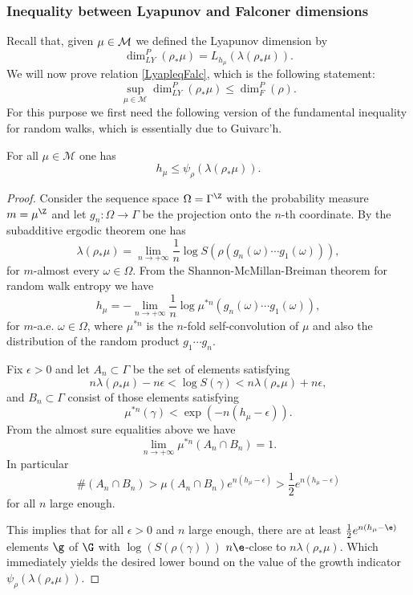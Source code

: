 \subsubsection{Inequality between Lyapunov and Falconer dimensions\label{proofLyap}}

Recall that, given \(\mu \in\nobreak \mathcal{M}\) we defined the Lyapunov dimension by
\[
\dim_{LY}^P(\rho_\ast \mu) = L_{h_\mu}(\lambda(\rho_*\mu)).
\]
We will now prove relation \eqref{LyapleqFalc}, which is the following statement:
\[
\sup_{\mu \in \mathcal{M}}\dim_{LY}^P(\rho_\ast \mu) \le \dim_F^P(\rho).
\]
For this purpose we first need the following version of the fundamental inequality for random walks, which is essentially due to Guivarc'h.

\begin{lemma}
For all \(\mu \in \mathcal{M}\) one has
\[
h_\mu \le \psi_{\rho}(\lambda(\rho_*\mu)).
\]
\end{lemma}
\begin{proof}
Consider the sequence space \(\Omega = \Gamma^{\Z}\) with the probability measure \(m = \mu^\Z\) and let \(g_n:\Omega \to \Gamma\) be the projection onto the \(n\)-th coordinate.
By the subadditive ergodic theorem \cite{Ose68} one has
\[
\lambda(\rho_*\mu) = \lim_{n \to +\infty}\frac{1}{n}\log S(\rho(g_n(\omega)\cdots g_1(\omega))),
\]
for \(m\)-almost every \(\omega \in \Omega\).
From the Shannon-McMillan-Breiman theorem for random walk entropy \cite{KV83} we have
\[
h_\mu = -\lim_{n \to +\infty}\frac{1}{n}\log \mu^{\ast n}(g_n(\omega)\cdots g_1(\omega)),
\]
for \(m\)-a.e. \(\omega \in \Omega\), where \(\mu^{\ast n}\) is the \(n\)-fold self-convolution of \(\mu\) and also the distribution of the random product \(g_1 \cdots g_n\).

Fix \(\epsilon > 0\) and let \(A_n \subset \Gamma\) be the set of elements satisfying
\[
n\lambda(\rho_*\mu) - n\epsilon < \log S(\gamma) < n\lambda(\rho_*\mu) + n\epsilon,
\]
and \(B_n \subset \Gamma\) consist of those elements satisfying
\[
\mu^{\ast n}(\gamma) < \exp(-n(h_\mu - \epsilon)).
\]
From the almost sure equalities above we have
\[
\lim_{n \to +\infty}\mu^{\ast n}(A_n \cap B_n) = 1.
\]
In particular
\[
\# (A_n \cap B_n) > \mu(A_n \cap B_n)e^{n(h_\mu - \epsilon)} > \frac{1}{2}e^{n(h_\mu - \epsilon)}
\]
for all \(n\) large enough.

This implies that for all \(\epsilon >0\) and \(n\) large enough, there are at least \(\frac{1}{2}e^{n(h_\mu -\e)}\) elements \(\g\) of \(\G\) with \(\log(S(\rho(\gamma)))\) \(n \e\)-close to \(n\lambda (\rho_*\mu)\). Which immediately yields the desired lower bound on the value of the growth indicator \(\psi_{\rho}(\lambda(\rho_*\mu))\).
\end{proof}

